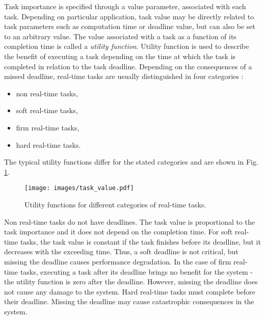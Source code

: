 Task importance is specified through a value parameter, associated with each task.
Depending on particular application, task value may be directly related to task parameters such as computation time or deadline value, but can also be set to an arbitrary value. 
The value associated with a task as a function of its completion time is called a \textit{utility function}.
Utility function is used to describe the benefit of executing a task depending on the time at which the task is completed in relation to the task deadline.
Depending on the consequences of a missed deadline, real-time tasks are usually distinguished in four categories \cite{buttazzo2011hard}:
\begin{itemize}
    \item non real-time tasks,
    \item soft real-time tasks,
    \item firm real-time tasks,
    \item hard real-time tasks.
\end{itemize}
The typical utility functions differ for the stated categories and are shown in Fig. \ref{utility}.
\begin{figure}[ht]
    \centering
    \texttt{[image: images/task\_value.pdf]}
    \caption{Utility functions for different categories of real-time tasks.}
    \label{utility}
\end{figure}
Non real-time tasks do not have deadlines. The task value is proportional to the task importance and it does not depend on the completion time.
For soft real-time tasks, the task value is constant if the task finishes before its deadline, but it decreases with the exceeding time. 
Thus, a soft deadline is not critical, but missing the deadline causes performance degradation.
In the case of firm real-time tasks, executing a task after its deadline brings no benefit for the system - the utility function is zero after the deadline. However, missing the deadline does not cause any damage to the system.
Hard real-time tasks must complete before their deadline. Missing the deadline may cause catastrophic consequences in the system.

